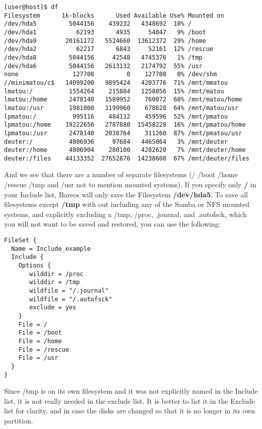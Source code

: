 \footnotesize
\begin{verbatim}
[user@host]$ df
Filesystem      1k-blocks      Used Available Use% Mounted on
/dev/hda5         5044156    439232   4348692  10% /
/dev/hda1           62193      4935     54047   9% /boot
/dev/hda9        20161172   5524660  13612372  29% /home
/dev/hda2           62217      6843     52161  12% /rescue
/dev/hda8         5044156     42548   4745376   1% /tmp
/dev/hda6         5044156   2613132   2174792  55% /usr
none               127708         0    127708   0% /dev/shm
//minimatou/c$   14099200   9895424   4203776  71% /mnt/mmatou
lmatou:/          1554264    215884   1258056  15% /mnt/matou
lmatou:/home      2478140   1589952    760072  68% /mnt/matou/home
lmatou:/usr       1981000   1199960    678628  64% /mnt/matou/usr
lpmatou:/          995116    484112    459596  52% /mnt/pmatou
lpmatou:/home    19222656   2787880  15458228  16% /mnt/pmatou/home
lpmatou:/usr      2478140   2038764    311260  87% /mnt/pmatou/usr
deuter:/          4806936     97684   4465064   3% /mnt/deuter
deuter:/home      4806904    280100   4282620   7% /mnt/deuter/home
deuter:/files    44133352  27652876  14238608  67% /mnt/deuter/files
\end{verbatim}
\normalsize

And we see that there are a number of separate filesystems (/ /boot
/home /rescue /tmp and /usr not to mention mounted systems).
If you specify only {\bf /} in your Include list, Bareos will only save the
Filesystem {\bf /dev/hda5}. To save all filesystems except {\bf /tmp} with
out including any of the Samba or NFS mounted systems, and explicitly
excluding a /tmp, /proc, .journal, and .autofsck, which you will not want to
be saved and restored, you can use the following:

\footnotesize
\begin{verbatim}
FileSet {
  Name = Include_example
  Include {
    Options {
       wilddir = /proc
       wilddir = /tmp
       wildfile = "/.journal"
       wildfile = "/.autofsck"
       exclude = yes
    }
    File = /
    File = /boot
    File = /home
    File = /rescue
    File = /usr
  }
}
\end{verbatim}
\normalsize

Since /tmp is on its own filesystem and it was not explicitly named in the
Include list, it is not really needed in the exclude list. It is better to
list it in the Exclude list for clarity, and in case the disks are changed so
that it is no longer in its own partition.

